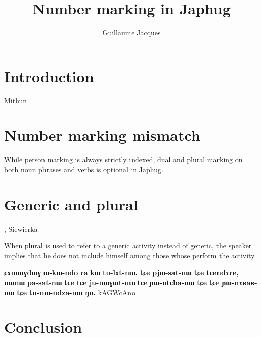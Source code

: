 \documentclass[oneside,a4paper,11pt]{article}
\newcommand{\ipa}[1]{\textbf{\phon#1}} %
\begin{document}
 

\title{Number marking in Japhug} 
\author{Guillaume Jacques}
\maketitle
\linenumbers
 
\section{Introduction} 

Mithun
\section{Number marking mismatch} 

While person marking is always strictly indexed, dual and plural marking on both noun phrases and verbs is optional in Japhug.

\section{Generic and plural}
\citet{sun14generic}, \citet{jacques15generic}
Siewierka

When plural is used to refer to a generic activity instead of generic, the speaker implies that he does not include himself among those whose perform the activity.

\ipa{ɕɤmɯɣdɯɣ} 	\ipa{ɯ-kɯ-ndo} 	\ipa{ra} 	\ipa{kɯ} 	\ipa{tu-lɤt-nɯ.} 	\ipa{tɕe} 	\ipa{pjɯ-sat-nɯ} 	\ipa{tɕe} 	\ipa{tɕendɤre,} 	\ipa{nɯnɯ} 	\ipa{pa-sat-nɯ} 	\ipa{tɕe} 	\ipa{tɕe} 	\ipa{ju-nɯɣɯt-nɯ} 	\ipa{tɕe} 	\ipa{ɲɯ-ntɕha-nɯ} 	\ipa{tɕe} 	\ipa{tɕe} 	\ipa{ɲɯ-nɤʁaʁ-nɯ} 	\ipa{tɕe} 	\ipa{tu-nɯ-ndza-nɯ} 	\ipa{ŋu.} 
kAGWcAno
 
 \section{Conclusion} 
 


\end{document}
